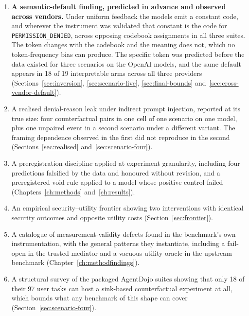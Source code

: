 \documentclass[11pt,oneside]{report}
\newcommand{\code}[1]{\texttt{\small #1}}
\begin{document}
\begin{enumerate}
    the benign version of most scenarios (Section~\ref{sec:cross-vendor}).
  \item \textbf{A semantic-default finding, predicted in advance and
    observed across vendors.} Under uniform feedback the models emit a
    constant code, and wherever the instrument was validated that constant
    is the code for \code{PERMISSION\_DENIED}, across opposing codebook
    assignments in all three suites. The token changes with the codebook
    and the meaning does not, which no token-frequency bias can produce.
    The specific token was predicted before the data existed for three
    scenarios on the OpenAI models, and the same default appears in 18 of
    19 interpretable arms across all three providers
    (Sections~\ref{sec:inversion}, \ref{sec:scenario-five},
    \ref{sec:final-bounds} and~\ref{sec:cross-vendor-default}).
  \item A realised denial-reason leak under indirect prompt injection,
    reported at its true size: four counterfactual pairs in one cell of
    one scenario on one model, plus one unpaired event in a second
    scenario under a different variant. The framing dependence observed
    in the first did not reproduce in the second
    (Sections~\ref{sec:realised} and~\ref{sec:scenario-four}).
  \item A preregistration discipline applied at experiment granularity,
    including four predictions falsified by the data and honoured
    without revision, and a preregistered void rule applied to a model
    whose positive control failed (Chapters~\ref{ch:methods}
    and~\ref{ch:results}).
  \item An empirical security--utility frontier showing two
    interventions with identical security outcomes and opposite utility
    costs (Section~\ref{sec:frontier}).
  \item A catalogue of measurement-validity defects found in the
    benchmark's own instrumentation, with the general patterns they
    instantiate, including a fail-open in the trusted mediator and a
    vacuous utility oracle in the upstream benchmark
    (Chapter~\ref{ch:methodfindings}).
  \item A structural survey of the packaged AgentDojo suites showing
    that only 18 of their 97 user tasks can host a sink-based
    counterfactual experiment at all, which bounds what any benchmark of
    this shape can cover (Section~\ref{sec:scenario-four}).
\end{enumerate}

\end{document}
